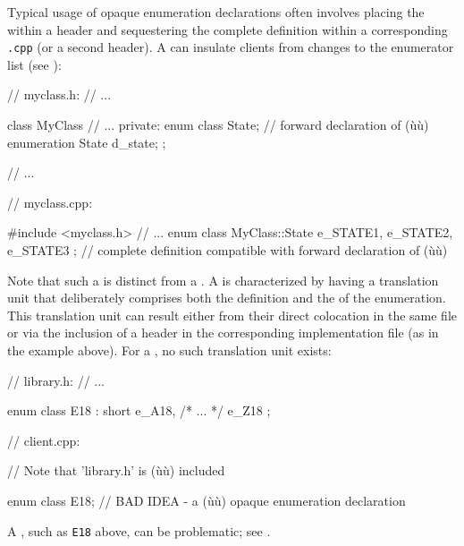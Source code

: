 Typical usage of opaque enumeration declarations often involves placing the 
within a header and sequestering the complete definition within a corresponding \lstinline!.cpp! (or a second header). A  can insulate clients from changes to the enumerator
list (see ):

\begin{emcppslisting}
// myclass.h:
// ...

class MyClass {
    // ...
private:
    enum class State;  // forward declaration of (ù{}ù) enumeration
    State d_state;
};

// ...

// myclass.cpp:

#include <myclass.h>
// ...
enum class MyClass::State { e_STATE1, e_STATE2, e_STATE3 };
    // complete definition compatible with forward declaration of (ù{}ù)
\end{emcppslisting}

Note that such a  is distinct from a .  A  is characterized by having a translation unit that deliberately comprises both the definition and the  of the enumeration.  This translation unit can result either from their direct colocation in the same file or via the inclusion of a header in the corresponding implementation file (as in the example above).  For a , no such translation unit exists:

\begin{emcppslisting}
// library.h:
// ...

enum class E18 : short { e_A18, /* ... */ e_Z18 };

// client.cpp:

// Note that 'library.h' is (ù{}ù) included

enum class E18;  // BAD IDEA - a (ù{}ù) opaque enumeration declaration
\end{emcppslisting}

A , such as \lstinline!E18! above, can be problematic; see .

